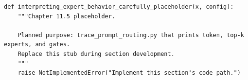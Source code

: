 \begin{lstlisting}[style=bookpython,caption={Planned code placeholder for interpreting expert behavior carefully.},label={lst:ch11-interpreting-expert-behavior-carefully}]
def interpreting_expert_behavior_carefully_placeholder(x, config):
    """Chapter 11.5 placeholder.

    Planned purpose: trace_prompt_routing.py that prints token, top-k experts, and gates.
    Replace this stub during section development.
    """
    raise NotImplementedError("Implement this section's code path.")
\end{lstlisting}
